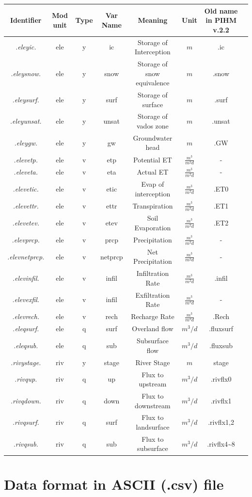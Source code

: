 \documentclass[]{scrbook}
\begin{document}
\begin{longtable}[]{@{}cccccccc@{}}
\toprule
Identifier & Mod unit & Type & Var Name & Meaning & Unit & Old name in
PIHM v.2.2 &\tabularnewline
\midrule
\endhead
\emph{.eleyic.} & ele & y & ic & Storage of Interception & \(m\) & .ic
&\tabularnewline
\emph{.eleysnow.} & ele & y & snow & Storage of snow equivalence & \(m\)
& .snow &\tabularnewline
\emph{.eleysurf.} & ele & y & surf & Storage of surface & \(m\) & .surf
&\tabularnewline
\emph{.eleyunsat.} & ele & y & unsat & Storage of vados zone & \(m\) &
.unsat &\tabularnewline
\emph{.eleygw.} & ele & y & gw & Groundwater head & \(m\) & .GW
&\tabularnewline
\emph{.elevetp.} & ele & v & etp & Potential ET & \(\frac{m^3}{m^2 d}\)
& - &\tabularnewline
\emph{.eleveta.} & ele & v & eta & Actual ET & \(\frac{m^3}{m^2 d}\) & -
&\tabularnewline
\emph{.elevetic.} & ele & v & etic & Evap of interception &
\(\frac{m^3}{m^2 d}\) & .ET0 &\tabularnewline
\emph{.elevettr.} & ele & v & ettr & Transpiration &
\(\frac{m^3}{m^2 d}\) & .ET1 &\tabularnewline
\emph{.elevetev.} & ele & v & etev & Soil Evaporation &
\(\frac{m^3}{m^2 d}\) & .ET2 &\tabularnewline
\emph{.elevprcp.} & ele & v & prcp & Precipitation &
\(\frac{m^3}{m^2 d}\) & - &\tabularnewline
\emph{.elevnetprcp.} & ele & v & netprcp & Net Precipitation &
\(\frac{m^3}{m^2 d}\) & - &\tabularnewline
\emph{.elevinfil.} & ele & v & infil & Infiltration Rate &
\(\frac{m^3}{m^2 d}\) & .infil &\tabularnewline
\emph{.elevexfil.} & ele & v & infil & Exfiltration Rate &
\(\frac{m^3}{m^2 d}\) & - &\tabularnewline
\emph{.elevrech.} & ele & v & rech & Recharge Rate &
\(\frac{m^3}{m^2 d}\) & .Rech &\tabularnewline
\emph{.eleqsurf.} & ele & q & surf & Overland flow & \(m^3/d\) &
.fluxsurf &\tabularnewline
\emph{.eleqsub.} & ele & q & sub & Subsurface flow & \(m^3/d\) &
.fluxsub &\tabularnewline
\emph{.rivystage.} & riv & y & stage & River Stage & \(m\) & stage
&\tabularnewline
\emph{.rivqup.} & riv & q & up & Flux to upstream & \(m^3/d\) & .rivflx0
&\tabularnewline
\emph{.rivqdown.} & riv & q & down & Flux to downstream & \(m^3/d\) &
.rivflx1 &\tabularnewline
\emph{.rivqsurf.} & riv & q & surf & Flux to landsurface & \(m^3/d\) &
.rivflx1,2\tabularnewline
\emph{.rivqsub.} & riv & q & sub & Flux to subsurface & \(m^3/d\) &
.rivflx4\textasciitilde{}8 &\tabularnewline
\bottomrule
\end{longtable}

\section{Data format in ASCII (.csv)
file}\label{data-format-in-ascii-.csv-file}
\end{document}
